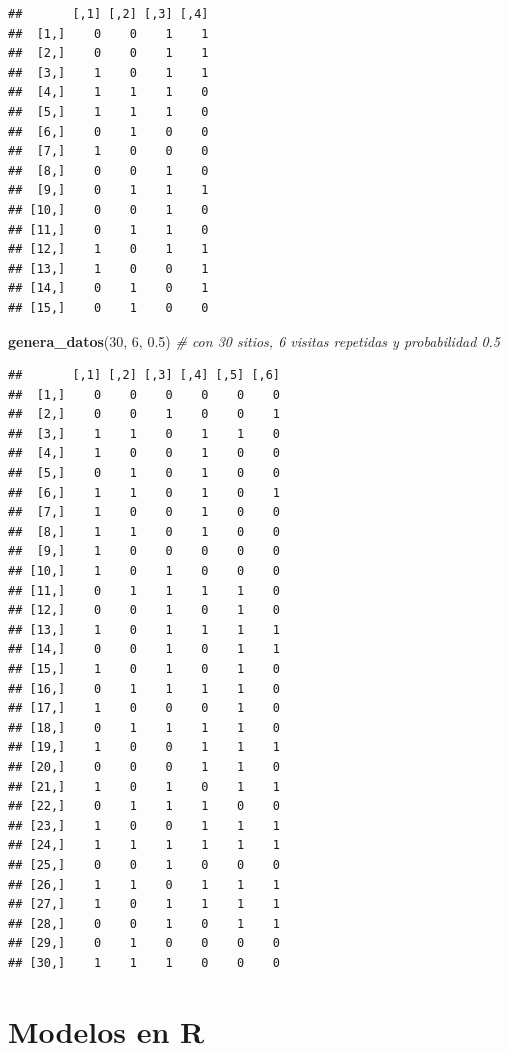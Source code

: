 \documentclass[
]{book}
\newenvironment{Shaded}{\begin{snugshade}}{\end{snugshade}}
\newcommand{\CommentTok}[1]{\textcolor[rgb]{0.56,0.35,0.01}{\textit{#1}}}
\newcommand{\DecValTok}[1]{\textcolor[rgb]{0.00,0.00,0.81}{#1}}
\newcommand{\FloatTok}[1]{\textcolor[rgb]{0.00,0.00,0.81}{#1}}
\newcommand{\KeywordTok}[1]{\textcolor[rgb]{0.13,0.29,0.53}{\textbf{#1}}}
\newcommand{\NormalTok}[1]{#1}
\begin{document}
\begin{verbatim}
##       [,1] [,2] [,3] [,4]
##  [1,]    0    0    1    1
##  [2,]    0    0    1    1
##  [3,]    1    0    1    1
##  [4,]    1    1    1    0
##  [5,]    1    1    1    0
##  [6,]    0    1    0    0
##  [7,]    1    0    0    0
##  [8,]    0    0    1    0
##  [9,]    0    1    1    1
## [10,]    0    0    1    0
## [11,]    0    1    1    0
## [12,]    1    0    1    1
## [13,]    1    0    0    1
## [14,]    0    1    0    1
## [15,]    0    1    0    0
\end{verbatim}

\begin{Shaded}
\begin{Highlighting}[]
\KeywordTok{genera_datos}\NormalTok{(}\DecValTok{30}\NormalTok{, }\DecValTok{6}\NormalTok{, }\FloatTok{0.5}\NormalTok{) }\CommentTok{# con 30 sitios, 6 visitas repetidas y probabilidad 0.5}
\end{Highlighting}
\end{Shaded}

\begin{verbatim}
##       [,1] [,2] [,3] [,4] [,5] [,6]
##  [1,]    0    0    0    0    0    0
##  [2,]    0    0    1    0    0    1
##  [3,]    1    1    0    1    1    0
##  [4,]    1    0    0    1    0    0
##  [5,]    0    1    0    1    0    0
##  [6,]    1    1    0    1    0    1
##  [7,]    1    0    0    1    0    0
##  [8,]    1    1    0    1    0    0
##  [9,]    1    0    0    0    0    0
## [10,]    1    0    1    0    0    0
## [11,]    0    1    1    1    1    0
## [12,]    0    0    1    0    1    0
## [13,]    1    0    1    1    1    1
## [14,]    0    0    1    0    1    1
## [15,]    1    0    1    0    1    0
## [16,]    0    1    1    1    1    0
## [17,]    1    0    0    0    1    0
## [18,]    0    1    1    1    1    0
## [19,]    1    0    0    1    1    1
## [20,]    0    0    0    1    1    0
## [21,]    1    0    1    0    1    1
## [22,]    0    1    1    1    0    0
## [23,]    1    0    0    1    1    1
## [24,]    1    1    1    1    1    1
## [25,]    0    0    1    0    0    0
## [26,]    1    1    0    1    1    1
## [27,]    1    0    1    1    1    1
## [28,]    0    0    1    0    1    1
## [29,]    0    1    0    0    0    0
## [30,]    1    1    1    0    0    0
\end{verbatim}

\hypertarget{modelos-en-r}{%
\chapter{Modelos en R}\label{modelos-en-r}}
\end{document}
